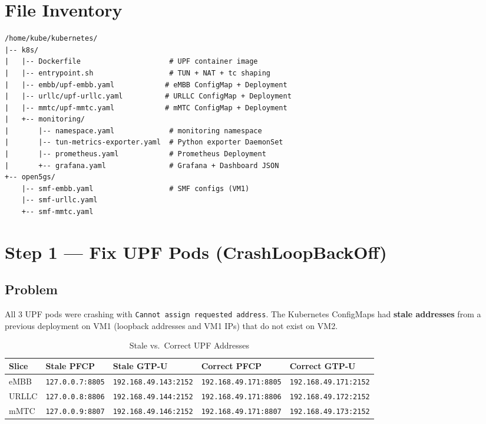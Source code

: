 \documentclass[12pt,a4paper]{article}
\begin{document}
\section{File Inventory}

\begin{lstlisting}[style=terminal, title=Project Structure]
/home/kube/kubernetes/
|-- k8s/
|   |-- Dockerfile                     # UPF container image
|   |-- entrypoint.sh                  # TUN + NAT + tc shaping
|   |-- embb/upf-embb.yaml            # eMBB ConfigMap + Deployment
|   |-- urllc/upf-urllc.yaml          # URLLC ConfigMap + Deployment
|   |-- mmtc/upf-mmtc.yaml            # mMTC ConfigMap + Deployment
|   +-- monitoring/
|       |-- namespace.yaml             # monitoring namespace
|       |-- tun-metrics-exporter.yaml  # Python exporter DaemonSet
|       |-- prometheus.yaml            # Prometheus Deployment
|       +-- grafana.yaml               # Grafana + Dashboard JSON
+-- open5gs/
    |-- smf-embb.yaml                  # SMF configs (VM1)
    |-- smf-urllc.yaml
    +-- smf-mmtc.yaml
\end{lstlisting}


\section{Step 1 — Fix UPF Pods (CrashLoopBackOff)}

\subsection{Problem}

All 3 UPF pods were crashing with \texttt{Cannot assign requested address}. The Kubernetes ConfigMaps had \textbf{stale addresses} from a previous deployment on VM1 (loopback addresses and VM1 IPs) that do not exist on VM2.

\begin{table}[H]
\centering
\begin{tabular}{lllll}
\toprule
\textbf{Slice} & \textbf{Stale PFCP} & \textbf{Stale GTP-U} & \textbf{Correct PFCP} & \textbf{Correct GTP-U} \\
\midrule
eMBB  & \texttt{127.0.0.7:8805} & \texttt{192.168.49.143:2152} & \texttt{192.168.49.171:8805} & \texttt{192.168.49.171:2152} \\
URLLC & \texttt{127.0.0.8:8806} & \texttt{192.168.49.144:2152} & \texttt{192.168.49.171:8806} & \texttt{192.168.49.172:2152} \\
mMTC  & \texttt{127.0.0.9:8807} & \texttt{192.168.49.146:2152} & \texttt{192.168.49.171:8807} & \texttt{192.168.49.173:2152} \\
\bottomrule
\end{tabular}
\caption{Stale vs.\ Correct UPF Addresses}
\end{table}
\end{document}
